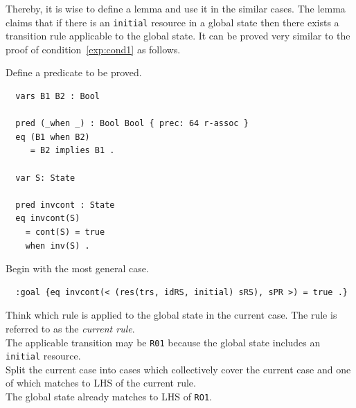 \documentclass[12pt]{report}
\begin{document}
Thereby, it is wise to define a lemma and use it in the similar cases.
The lemma claims that if there is an {\tt initial} resource in a
global state then there exists a transition rule applicable to the
global state. It can be proved very similar to the proof of
condition~\ref{exp:cond1} as follows.

 Define a predicate to be proved.
\small
\begin{verbatim}
  vars B1 B2 : Bool

  pred (_when _) : Bool Bool { prec: 64 r-assoc }
  eq (B1 when B2)
     = B2 implies B1 .

  var S: State

  pred invcont : State
  eq invcont(S) 
    = cont(S) = true
    when inv(S) .
\end{verbatim}
\normalsize
 Begin with the most general case.
\small
\begin{verbatim}
  :goal {eq invcont(< (res(trs, idRS, initial) sRS), sPR >) = true .}
\end{verbatim}
\normalsize
 Think which rule is applied to the global
state in the current case. The rule is referred to as the {\it current
rule}.\\
The applicable transition may be {\tt R01} because the global state
includes an {\tt initial} resource.\\

 Split the current case into cases which
collectively cover the current case and one of which matches to LHS of
the current rule. \\ 
The global state already matches to LHS of {\tt RO1}.\\
\end{document}
